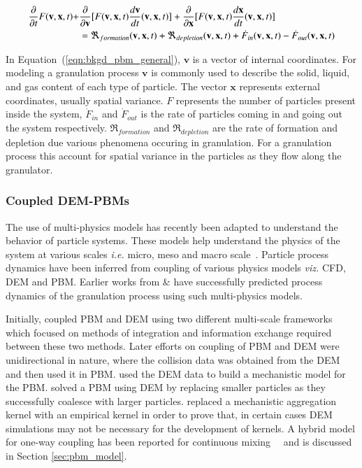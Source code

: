 \documentclass[preprint,11pt,authoryear]{elsarticle}
\begin{document}
\begin{align}
\frac{ \partial}{\partial t}F(\textbf{v},\textbf{x},t) +& \frac{\partial}{\partial 
\textbf{v}}[F(\textbf{v},\textbf{x},t)\frac{d\textbf{v}}{dt}(\textbf{v},\textbf{x},t)] 
+ \frac{\partial}{\partial \textbf{x}}[F(\textbf{v},\textbf{x},t)\frac{d\textbf{x}}{dt}
(\textbf{v},\textbf{x},t)] \notag\\
    &= 
\Re_{formation}(\textbf{v},\textbf{x},t)+\Re_{depletion}(\textbf{v},\textbf{x},t)
+\dot{F}_{in}(\textbf{v},\textbf{x},t)-\dot{F}_{out}(\textbf{v},\textbf{x},t)
\label{eqn:bkgd_pbm_general} 
\end{align}
    
In Equation~(\ref{eqn:bkgd_pbm_general}), $\textbf{v}$ is a vector of internal 
coordinates. For modeling a granulation process $\textbf{v}$ is commonly used 
to describe the solid, liquid, and gas content of each type of particle. The 
vector $\textbf{x}$ represents external coordinates, usually spatial variance. 
\textbf{$F$} represents the number of particles present inside the system, 
\textbf{$\dot{F}_{in}$} and \textbf{$\dot{F}_{out}$} is the rate of particles 
coming in and going out the system respectively. $\Re_{formation}$ and $\Re_{depletion}$ 
are the rate of formation and depletion due various phenomena occuring in granulation. 
For a granulation process this account for spatial variance in the particles as 
they flow along the granulator.

\subsubsection{Coupled DEM-PBMs}
The use of multi-physics models has recently been adapted to understand the behavior of 
particle systems. These models help understand the physics of the system at various scales 
\textit{i.e.} micro, meso and macro scale~\citep{sen2014}. Particle process dynamics have been 
inferred from coupling of various physics models \textit{viz.} CFD, 
DEM and PBM. Earlier works from \cite{sen2014} \& \cite{Barrasso2015cerd} have successfully 
predicted process dynamics of the granulation process using such multi-physics models.

Initially, \cite{ingram2004} coupled PBM and DEM using two different multi-scale frameworks which 
focused on methods of integration and information exchange required between these two methods. 
Later efforts on coupling of PBM and DEM were unidirectional in nature, where the collision 
data was obtained from the DEM and then used it in PBM. \cite{gantt2006} used the DEM data 
to build a mechanistic model for the PBM. \cite{Goldschmidt2003} solved a PBM using DEM by 
replacing smaller particles as they successfully coalesce with larger particles. 
\cite{Reinhold2012} replaced a mechanistic aggregation kernel with an empirical kernel 
in order to prove that, in certain cases DEM simulations may not be necessary for the 
development of kernels. A hybrid model for one-way coupling has been reported for continuous 
mixing~\citep{sen2013}~\citep{sen2013b} and is discussed in Section \ref{sec:pbm_model}.
\end{document}
